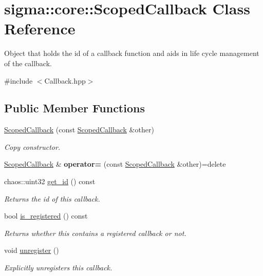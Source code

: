 \hypertarget{classsigma_1_1core_1_1_scoped_callback}{}\section{sigma\+:\+:core\+:\+:Scoped\+Callback Class Reference}
\label{classsigma_1_1core_1_1_scoped_callback}


Object that holds the id of a callback function and aids in life cycle management of the callback.  




{\ttfamily \#include $<$Callback.\+hpp$>$}

\subsection*{Public Member Functions}
\begin{DoxyCompactItemize}
\item 
\hyperlink{classsigma_1_1core_1_1_scoped_callback_ae39d91862f76b1804acc8edae410678e}{Scoped\+Callback} (const \hyperlink{classsigma_1_1core_1_1_scoped_callback}{Scoped\+Callback} \&other)
\begin{DoxyCompactList}\small\item\em Copy constructor. \end{DoxyCompactList}\item 
\hypertarget{classsigma_1_1core_1_1_scoped_callback_ab0eabc2e0c158643758501f9c6bc444c}{}\hyperlink{classsigma_1_1core_1_1_scoped_callback}{Scoped\+Callback} \& {\bfseries operator=} (const \hyperlink{classsigma_1_1core_1_1_scoped_callback}{Scoped\+Callback} \&other)=delete\label{classsigma_1_1core_1_1_scoped_callback_ab0eabc2e0c158643758501f9c6bc444c}

\item 
\hypertarget{classsigma_1_1core_1_1_scoped_callback_a3b4ae371184bb639999677cf66440461}{}chaos\+::uint32 \hyperlink{classsigma_1_1core_1_1_scoped_callback_a3b4ae371184bb639999677cf66440461}{get\+\_\+id} () const \label{classsigma_1_1core_1_1_scoped_callback_a3b4ae371184bb639999677cf66440461}

\begin{DoxyCompactList}\small\item\em Returns the id of this callback. \end{DoxyCompactList}\item 
bool \hyperlink{classsigma_1_1core_1_1_scoped_callback_adafe2e52e653bca84d11f1d0baaec616}{is\+\_\+registered} () const 
\begin{DoxyCompactList}\small\item\em Returns whether this contains a registered callback or not. \end{DoxyCompactList}\item 
void \hyperlink{classsigma_1_1core_1_1_scoped_callback_ad8d8ea4671f58077c8f9ef020e52e125}{unregister} ()
\begin{DoxyCompactList}\small\item\em Explicitly unregisters this callback. \end{DoxyCompactList}\end{DoxyCompactItemize}


